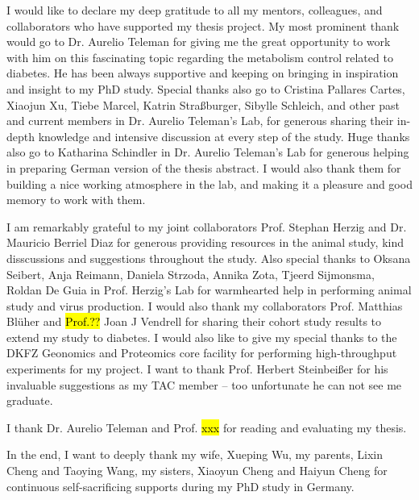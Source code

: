 I would like to declare my deep gratitude to all my mentors, colleagues, and collaborators who have supported my thesis project. My most prominent thank would go to Dr. Aurelio Teleman for giving me the great opportunity to work with him on this fascinating topic regarding the metabolism control related to diabetes. He has been always supportive and keeping on bringing in inspiration and insight to my PhD study. Special thanks also go to Cristina Pallares Cartes, Xiaojun Xu, Tiebe Marcel, Katrin Stra{\ss}burger, Sibylle Schleich, and other past and current members in Dr. Aurelio Teleman's Lab, for generous sharing their in-depth knowledge and intensive discussion at every step of the study. Huge thanks also go to Katharina Schindler in Dr. Aurelio Teleman's Lab for generous helping in preparing German version of the thesis abstract. I would also thank them for building a nice working atmosphere in the lab, and making it a pleasure and good memory to work with them. 

I am remarkably grateful to my joint collaborators Prof. Stephan Herzig and Dr. Mauricio Berriel Diaz for generous providing resources in the animal study, kind disscussions and suggestions throughout the study. Also special thanks to Oksana Seibert, Anja Reimann, Daniela Strzoda, Annika Zota, Tjeerd Sijmonsma, Roldan De Guia in Prof. Herzig's Lab for warmhearted help in performing animal study and virus production. I would also thank my collaborators Prof. Matthias Bl\"uher and \hl{Prof.??} Joan J Vendrell for sharing their cohort study results to extend my study to diabetes. I would also like to give my special thanks to the DKFZ Geonomics and Proteomics core facility for performing high-throughput experiments for my project. I want to thank Prof. Herbert Steinbei{\ss}er for his invaluable suggestions as my TAC member -- too unfortunate he can not see me graduate.

I thank Dr. Aurelio Teleman and Prof. \hl{xxx} for reading and evaluating my thesis.

In the end, I want to deeply thank my wife, Xueping Wu, my parents, Lixin Cheng and Taoying Wang, my sisters, Xiaoyun Cheng and Haiyun Cheng for continuous self-sacrificing supports during my PhD study in Germany. 


